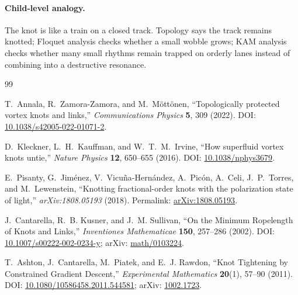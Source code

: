 \paragraph{Child-level analogy.}
The knot is like a train on a closed track.  Topology says the track remains
knotted; Floquet analysis checks whether a small wobble grows; KAM analysis
checks whether many small rhythms remain trapped on orderly lanes instead of
combining into a destructive resonance.





\ifresearchtrackincluded\else
\begin{thebibliography}{99}

T.~Annala, R.~Zamora-Zamora, and M.~M{\"o}tt{\"o}nen,
``Topologically protected vortex knots and links,''
\emph{Communications Physics} \textbf{5}, 309 (2022).
DOI: \href{https://doi.org/10.1038/s42005-022-01071-2}{10.1038/s42005-022-01071-2}.

D.~Kleckner, L.~H.~Kauffman, and W.~T.~M.~Irvine,
``How superfluid vortex knots untie,''
\emph{Nature Physics} \textbf{12}, 650--655 (2016).
DOI: \href{https://doi.org/10.1038/nphys3679}{10.1038/nphys3679}.

E.~Pisanty, G.~Jim{\'e}nez, V.~Vicu{\~n}a-Hern{\'a}ndez, A.~Pic{\'o}n, A.~Celi, J.~P.~Torres, and M.~Lewenstein,
``Knotting fractional-order knots with the polarization state of light,''
\emph{arXiv:1808.05193} (2018).
Permalink: \href{https://arxiv.org/abs/1808.05193}{arXiv:1808.05193}.

J.~Cantarella, R.~B. Kusner, and J.~M. Sullivan,
``On the Minimum Ropelength of Knots and Links,''
\emph{Inventiones Mathematicae} \textbf{150}, 257--286 (2002).
DOI: \href{https://doi.org/10.1007/s00222-002-0234-y}{10.1007/s00222-002-0234-y};
arXiv: \href{https://arxiv.org/abs/math/0103224}{math/0103224}.

T.~Ashton, J.~Cantarella, M.~Piatek, and E.~J. Rawdon,
``Knot Tightening by Constrained Gradient Descent,''
\emph{Experimental Mathematics} \textbf{20}(1), 57--90 (2011).
DOI: \href{https://doi.org/10.1080/10586458.2011.544581}{10.1080/10586458.2011.544581};
arXiv: \href{https://arxiv.org/abs/1002.1723}{1002.1723}.


\end{thebibliography}
